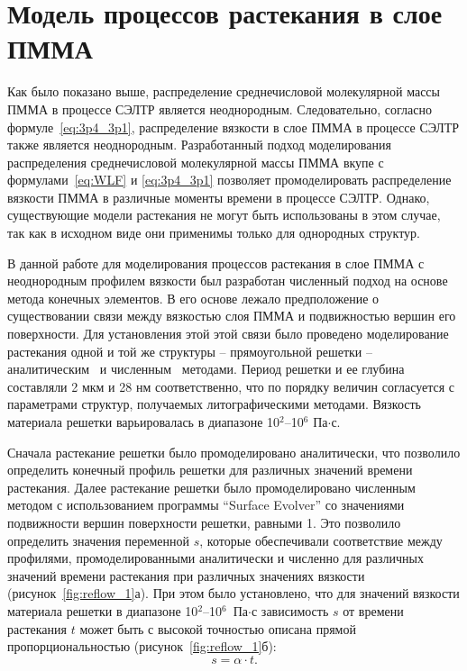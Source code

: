 \section{Модель процессов растекания в слое ПММА}

Как было показано выше, распределение среднечисловой молекулярной массы ПММА в процессе СЭЛТР является неоднородным. Следовательно, согласно формуле~\ref{eq:3p4_3p1}, распределение вязкости в слое ПММА в процессе СЭЛТР также является неоднородным.
Разработанный подход моделирования распределения среднечисловой молекулярной массы ПММА вкупе с формулами~\ref{eq:WLF} и \ref{eq:3p4_3p1} позволяет промоделировать распределение вязкости ПММА в различные моменты времени в процессе СЭЛТР.
Однако, существующие модели растекания не могут быть использованы в этом случае, так как в исходном виде они применимы только для однородных структур.

В данной работе для моделирования процессов растекания в слое \linebreak ПММА с неоднородным профилем вязкости был разработан численный подход на основе метода конечных элементов.
В его основе лежало предположение о существовании связи между вязкостью слоя ПММА и подвижностью вершин его поверхности.
Для установления этой этой связи было проведено моделирование растекания одной и той же структуры -- прямоугольной решетки -- аналитическим~\cite{Leveder_2011} и численным~\cite{Brakke_SE} методами.
Период решетки и ее глубина составляли 2 мкм и 28 нм соответственно, что по порядку величин согласуется с параметрами структур, получаемых литографическими методами.
Вязкость материала решетки варьировалась в диапазоне 10$^\text{2}$--10$^\text{6}$ Па$\cdot$с.

Сначала растекание решетки было промоделировано аналитически, что позволило определить конечный профиль решетки для различных значений времени растекания.
Далее растекание решетки было промоделировано численным методом с использованием программы ``Surface Evolver'' со значениями подвижности вершин поверхности решетки, равными 1.
Это позволило определить значения переменной $s$, которые обеспечивали соответствие между профилями, промоделированными аналитически и численно для различных значений времени растекания при различных значениях вязкости (рисунок~\ref{fig:reflow_1}а).
При этом было установлено, что для значений вязкости материала решетки в диапазоне 10$^\text{2}$--10$^\text{6}$~Па$\cdot$с зависимость $s$ от времени растекания $t$ может быть с высокой точностью описана прямой пропорциональностью (рисунок~\ref{fig:reflow_1}б):
\begin{equation}
	s = \alpha \cdot t.
\end{equation}

